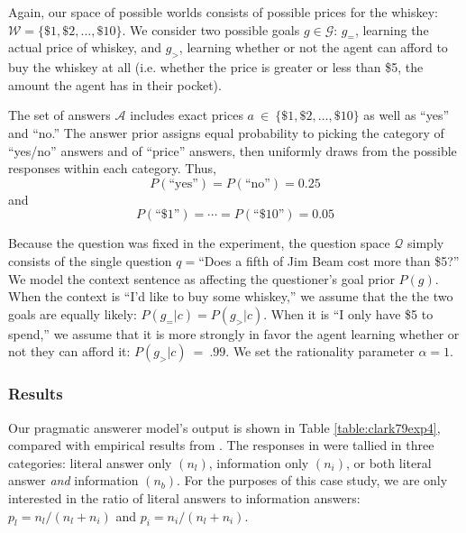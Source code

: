 \documentclass[12pt, floatsintext, jou]{apa6}
\begin{document}
Again, our space of possible worlds consists of possible prices for the whiskey: $\mathcal{W} = \{\$1, \$2, \dots, \$10\}$. We consider two possible goals $g \in \mathcal{G}$: $g_=$, learning the actual price of whiskey,  and $g_>$, learning whether or not the agent can afford to buy the whiskey at all (i.e. whether the price is greater or less than \$5, the amount the agent has in their pocket). 

The set of answers $\mathcal{A}$ includes exact prices $a~\in~\{\$1, \$2, \dots, \$10\}$ as well as ``yes'' and ``no.'' The answer prior assigns equal probability to picking the category of ``yes/no'' answers and of ``price'' answers, then uniformly draws from the possible responses within each category. Thus, $$P(\textrm{``yes''}) = P(\textrm{``no''}) = 0.25$$ and $$P(\textrm{``\$1''}) = \cdots = P(\textrm{``\$10''}) = 0.05$$

Because the question was fixed in the experiment, the question space $\mathcal{Q}$ simply consists of the single question $q = $``Does a fifth of Jim Beam cost more than \$5?''  We model the context sentence as affecting the questioner's goal prior $P(g)$. When the context is ``I'd like to buy some whiskey,'' we assume that the the two goals are equally likely: $P(g_= | c) = P(g_> | c)$. When it is ``I only have \$5 to spend,'' we assume that it is more strongly in favor the agent learning whether or not they can afford it: $P(g_> | c)~=~.99$. We set the rationality parameter $\alpha = 1$.


\subsubsection{Results} 

Our pragmatic answerer model's output is shown in Table \ref{table:clark79exp4}, compared with empirical results from . The responses in  were tallied in three categories: literal answer only $(n_l)$, information only $(n_i)$, or both literal answer \emph{and} information $(n_b)$. For the purposes of this case study, we are only interested in the ratio of literal answers to information answers: $p_l = n_l/(n_l+n_i)$ and $p_i = n_i/(n_l+n_i)$.
\end{document}
